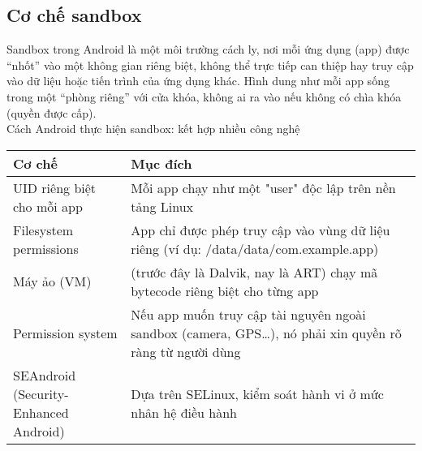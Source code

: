 \subsection{Cơ chế sandbox}
\renewcommand{\labelitemi}{--}    
    \begin{flushleft}
        \hspace*{0.8cm}Sandbox trong Android là một môi trường cách ly, nơi mỗi ứng dụng (app) được “nhốt” vào một không gian riêng biệt, không thể trực tiếp can thiệp hay truy cập vào dữ liệu hoặc tiến trình của ứng dụng khác. Hình dung như mỗi app sống trong một “phòng riêng” với cửa khóa, không ai ra vào nếu không có chìa khóa (quyền được cấp).\\
        \newpage
        \setlength{\leftmargini}{1.5cm}
        \hspace*{0.8cm}Cách Android thực hiện sandbox: kết hợp nhiều công nghệ
        \begin{center}
            \renewcommand{\arraystretch}{1.5}
            \begin{tabular}{|p{4.5cm}|p{11cm}|}
            \hline
            \textbf{Cơ chế} & \textbf{Mục đích} \\
            \hline
            UID riêng biệt cho mỗi app	 & Mỗi app chạy như một "user" độc lập trên nền tảng Linux            \\
            \hline
            Filesystem permissions	 & App chỉ được phép truy cập vào vùng dữ liệu riêng (ví dụ: /data/data/com.example.app) \\
            \hline
            Máy ảo (VM)	 & (trước đây là Dalvik, nay là ART) chạy mã bytecode riêng biệt cho từng app            \\
            \hline
            Permission system	 & 	Nếu app muốn truy cập tài nguyên ngoài sandbox (camera, GPS…), nó phải xin quyền rõ ràng từ người dùng            \\
            \hline
            SEAndroid (Security-Enhanced Android)	 & 	Dựa trên SELinux, kiểm soát hành vi ở mức nhân hệ điều hành            \\
            \hline
            \end{tabular}
            \end{center}
    \end{flushleft}

